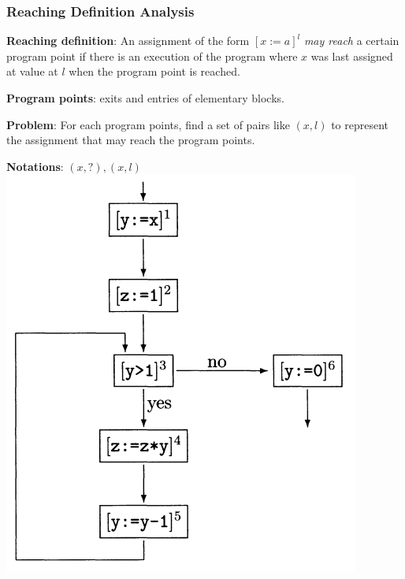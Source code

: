 \documentclass[aspectratio=1610, 13pt]{beamer}
\begin{document}
\begin{frame}\frametitle{Reaching Definition Analysis}
\begin{multicols}{2}
\textbf{Reaching definition}: An assignment of the form $[x := a]^l$ \textit{may reach} a certain program point if there is an execution of the program where $x$ was last assigned at value at $l$ when the program point is reached.

\textbf{Program points}: exits and entries of elementary blocks.


\textbf{Problem}: For each program points, find a set of pairs like $(x,l)$ to represent the assignment that may reach the program points.


\textbf{Notations}: $(x, ?), (x, l)$
\includegraphics[scale=0.35]{small_demo.png}
\end{multicols}
\end{frame}
\end{document}
